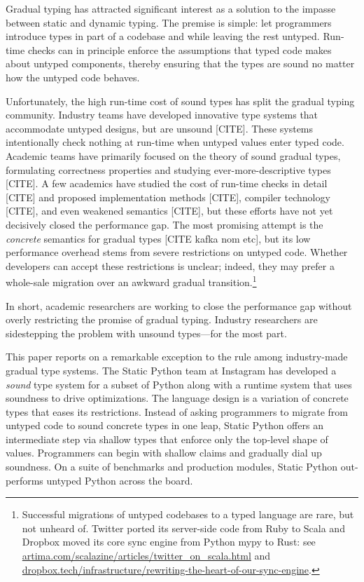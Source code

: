 \documentclass[english,cleveref,submission]{programming}
\newcommand{\shorturl}[2]{\href{#1#2}{#2}}
\newcommand{\SP}{Static Python}
\begin{document}
Gradual typing has attracted significant interest as a solution to
the impasse between static and dynamic typing.
The premise is simple: let programmers introduce types in part of a
codebase and while leaving the rest untyped.
Run-time checks can in principle enforce the assumptions that
typed code makes about untyped components, thereby ensuring that
the types are sound no matter how the untyped code behaves.

Unfortunately, the high run-time cost of sound types has split
the gradual typing community.
Industry teams have developed innovative type systems that accommodate
untyped designs, but are unsound [CITE].
These systems intentionally check nothing at run-time when untyped values enter
typed code.
Academic teams have primarily focused on the theory of sound
gradual types, formulating correctness properties and studying ever-more-descriptive types [CITE].
A few academics have studied the cost of run-time checks
in detail [CITE] and proposed implementation methods [CITE],
compiler technology [CITE],
and even weakened semantics [CITE], but these efforts have not yet
decisively closed the performance gap.
The most promising attempt is the \emph{concrete} semantics
for gradual types [CITE kafka nom etc], but its low performance
overhead stems from severe restrictions on untyped code.
Whether developers can accept these restrictions is unclear;
indeed, they may prefer a whole-sale migration over an awkward
gradual transition.\footnote{Successful migrations of untyped codebases
to a typed language are rare, but not unheard of.
Twitter ported its server-side code from Ruby to Scala
and Dropbox moved its core sync engine from Python mypy to Rust: see
\shorturl{http://www.}{artima.com/scalazine/articles/twitter\_on\_scala.html} and
\shorturl{https://}{dropbox.tech/infrastructure/rewriting-the-heart-of-our-sync-engine}.}

In short, academic researchers are working to close the performance gap
without overly restricting the promise of gradual typing.
Industry researchers are sidestepping the problem with unsound types---for the most part.

This paper reports on a remarkable exception to the rule among industry-made gradual type systems.
The \SP{} team at Instagram has developed a \emph{sound} type system for a subset of
Python along with a runtime system that uses soundness to drive optimizations.
The language design is a variation of concrete types that eases its restrictions.
Instead of asking programmers to migrate from untyped code to sound concrete types
in one leap, \SP{} offers an intermediate step via shallow types that enforce
only the top-level shape of values.
Programmers can begin with shallow claims and gradually dial up soundness.
On a suite of benchmarks and production modules, Static Python out-performs untyped
Python across the board.
\end{document}
